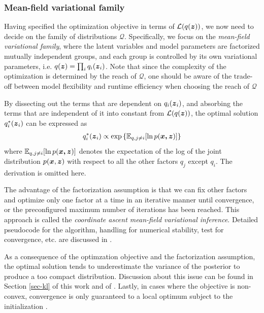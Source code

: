\subsubsection*{Mean-field variational family}

Having specified the optimization objective in terms of $\mathcal{L}(q(\boldsymbol{z}))$, we now need to decide on the family of distributions $\mathcal{Q}$.
Specifically, we focus on the \emph{mean-field variational family}, where the latent variables and model parameters are factorized mutually independent groups, and each group is controlled by its own variational parameters, i.e. $q(\boldsymbol{z}) = \prod_i{q_i(\boldsymbol{z}_i)}$.
Note that since the complexity of the optimization is determined by the reach of $\mathcal{Q}$, one should be aware of the trade-off between model flexibility and runtime efficiency when choosing the reach of $\mathcal{Q}$

By dissecting out the terms that are dependent on $q_i(\boldsymbol{z}_i)$, and absorbing the terms that are independent of it into constant from $\mathcal{L}(q(\boldsymbol{z}))$, the optimal solution $q_i^*(\boldsymbol{z}_i)$ can be expressed as
\begin{align}
    q_i^*(\boldsymbol{z}_i) \propto \exp{\{
        \mathbb{E}_{q,j \neq i}[\ln{p(\boldsymbol{\boldsymbol{x}, \boldsymbol{z}})}]
        \}}
    \label{eq-elbo-optimal-factor}
\end{align}
where $\mathbb{E}_{q,j \neq i}[\ln{p(\boldsymbol{\boldsymbol{x}, \boldsymbol{z}})}]$ denotes the expectation of the log of the joint distribution $p(\boldsymbol{x}, \boldsymbol{z})$ with respect to all the other factors $q_j$ except $q_i$.
The derivation \cite[]{bishop2006pattern} is omitted here.

The advantage of the factorization assumption is that we can fix other factors and optimize only one factor at a time in an iterative manner until convergence, or the preconfigured maximum number of iterations has been reached.
This approach is called the \emph{coordinate ascent mean-field variational inference}.
Detailed pseudocode for the algorithm, handling for numerical stability, test for convergence, etc. are discussed in \cite{blei2017variational}.

As a consequence of the optimzation objective and the factorization assumption, the optimal solution tends to underestimate the variance of the posterior to produce a too compact distribution.
Discussion about this issue can be found in Section \ref{sec-kl} of this work and  of \cite{bishop2006pattern}.
Lastly, in cases where the objective is non-convex, convergence is only guaranteed to a local optimum subject to the initialization \citep{blei2017variational}.

